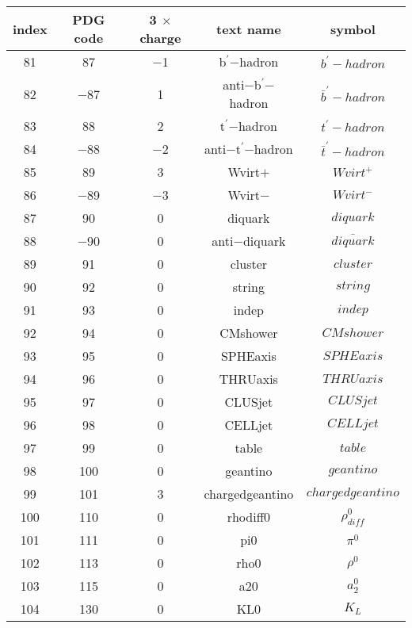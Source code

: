 \documentclass{article}
\begin{document}
\begin{table}[!htbp]
\centering
\begin{tabular}{|c|c|c|c|c|}
\hline
index & PDG code & 3 $\times$ charge & text name & symbol \\
\hline
81 & 87 & $-$1 & b$^{\prime}$$-$hadron & $b^{\prime}-hadron$ \\
\hline
82 & $-$87 & 1 & anti$-$b$^{\prime}$$-$hadron & $\bar{b}^{\prime}-hadron$ \\
\hline
83 & 88 & 2 & t$^{\prime}$$-$hadron & $t^{\prime}-hadron$ \\
\hline
84 & $-$88 & $-$2 & anti$-$t$^{\prime}$$-$hadron & $\bar{t}^{\prime}-hadron$ \\
\hline
85 & 89 & 3 & Wvirt$+$ & $Wvirt^{+}$ \\
\hline
86 & $-$89 & $-$3 & Wvirt$-$ & $Wvirt^{-}$ \\
\hline
87 & 90 & 0 & diquark & $diquark$ \\
\hline
88 & $-$90 & 0 & anti$-$diquark & $\bar{diquark}$ \\
\hline
89 & 91 & 0 & cluster & $cluster$ \\
\hline
90 & 92 & 0 & string & $string$ \\
\hline
91 & 93 & 0 & indep & $indep$ \\
\hline
92 & 94 & 0 & CMshower & $CMshower$ \\
\hline
93 & 95 & 0 & SPHEaxis & $SPHEaxis$ \\
\hline
94 & 96 & 0 & THRUaxis & $THRUaxis$ \\
\hline
95 & 97 & 0 & CLUSjet & $CLUSjet$ \\
\hline
96 & 98 & 0 & CELLjet & $CELLjet$ \\
\hline
97 & 99 & 0 & table & $table$ \\
\hline
98 & 100 & 0 & geantino & $geantino$ \\
\hline
99 & 101 & 3 & chargedgeantino & $chargedgeantino$ \\
\hline
100 & 110 & 0 & rho\underline{\hspace{0.6em}}diff0 & $\rho_{diff}^{0}$ \\
\hline
101 & 111 & 0 & pi0 & $\pi^{0}$ \\
\hline
102 & 113 & 0 & rho0 & $\rho^{0}$ \\
\hline
103 & 115 & 0 & a\underline{\hspace{0.6em}}20 & $a_{2}^{0}$ \\
\hline
104 & 130 & 0 & K\underline{\hspace{0.6em}}L0 & $K_{L}$ \\

\end{tabular}
\end{table}
\end{document}
